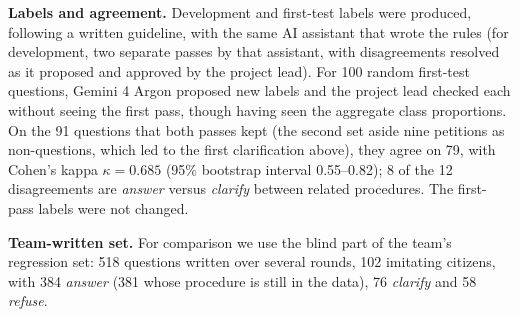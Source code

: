 \textbf{Labels and agreement.} Development and first-test labels were produced, following a written guideline, with the same AI
assistant that wrote the rules (for development, two separate passes by that assistant, with disagreements resolved as it proposed and
approved by the project lead). For 100 random first-test questions, Gemini 4 Argon proposed new labels and the project lead checked each
without seeing the first pass, though having seen the aggregate class proportions. On the 91 questions that both passes kept (the second set aside nine petitions as non-questions, which led to the first
clarification above), they agree on 79, with Cohen's kappa\cite{cohen1960} $\kappa=0.685$ (95\% bootstrap interval 0.55--0.82); 8 of the 12
disagreements are \emph{answer} versus \emph{clarify} between related procedures. The first-pass labels were not changed.

\textbf{Team-written set.} For comparison we use the blind part of the team's regression set: 518 questions written over several rounds,
102 imitating citizens, with 384 \emph{answer} (381 whose procedure is still in the data), 76 \emph{clarify} and 58 \emph{refuse}.
